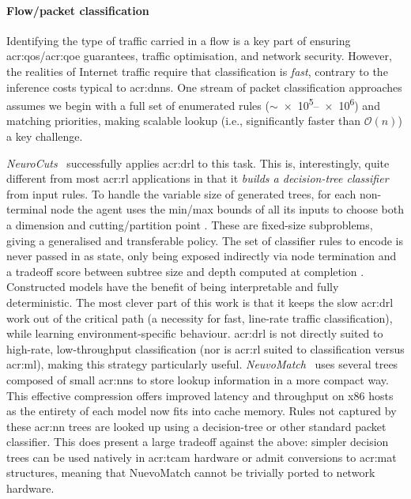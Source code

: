 \paragraph{Flow/packet classification}
Identifying the type of traffic carried in a flow is a key part of ensuring \gls{acr:qos}/\gls{acr:qoe} guarantees, traffic optimisation, and network security.
However, the realities of Internet traffic require that classification is \emph{fast}, contrary to the inference costs typical to \glspl{acr:dnn}.
One stream of packet classification approaches assumes we begin with a full set of enumerated rules ($\sim$\numrange{e5}{e6}) and matching priorities, making scalable lookup (i.e., significantly faster than $\mathcal{O}\left(n\right)$) a key challenge.

\emph{NeuroCuts}~\parencite{DBLP:conf/sigcomm/LiangZJS19} successfully applies \gls{acr:drl} to this task.
This is, interestingly, quite different from most \gls{acr:rl} applications in that it \emph{builds a decision-tree classifier} from input rules.
To handle the variable size of generated trees, for each non-terminal node the agent uses the min/max bounds of all its inputs \prllitstate{} to choose both a dimension and cutting/partition point \prllitact{}.
These are fixed-size subproblems, giving a generalised and transferable policy.
The set of classifier rules to encode is never passed in as state, only being exposed indirectly via node termination and a tradeoff score between subtree size and depth computed at completion \prllitreward.
Constructed models have the benefit of being interpretable and fully deterministic.
The most clever part of this work is that it keeps the slow \gls{acr:drl} work out of the critical path (a necessity for fast, line-rate traffic classification), while learning environment-specific behaviour.
\gls{acr:drl} is not directly suited to high-rate, low-throughput classification (nor is \gls{acr:rl} suited to classification versus \gls{acr:ml}), making this strategy particularly useful.
\emph{NeuvoMatch}~\parencite{DBLP:conf/sigcomm/RashelbachRS20} uses several trees composed of small \glspl{acr:nn} to store lookup information in a more compact way.
This effective compression offers improved latency and throughput on x86 hosts as the entirety of each model now fits into cache memory.
Rules not captured by these \gls{acr:nn} trees are looked up using a decision-tree or other standard packet classifier.
This does present a large tradeoff against the above: simpler decision trees can be used natively in \gls{acr:tcam} hardware or admit conversions to \gls{acr:mat} structures, meaning that NuevoMatch cannot be trivially ported to network hardware.

